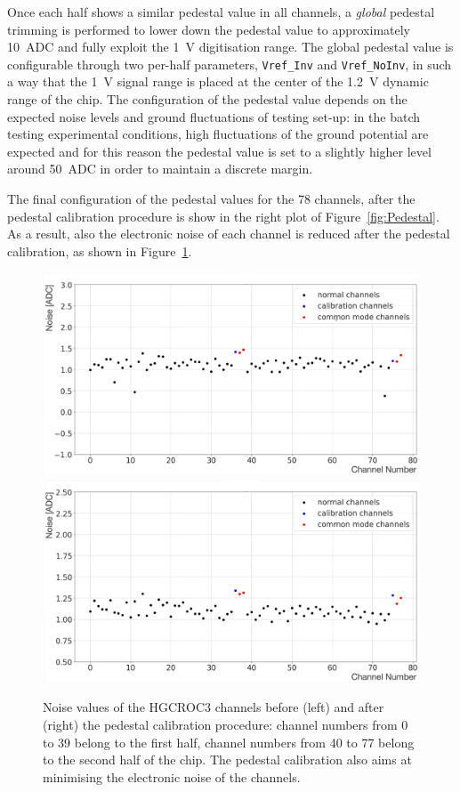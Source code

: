 \bigbreak

Once each half shows a similar pedestal value in all channels, a \textit{global} pedestal trimming is performed to lower down the pedestal value to approximately 10~ADC and fully exploit the 1~V digitisation range.
The global pedestal value is configurable through two per-half parameters, \texttt{Vref\_Inv} and \texttt{Vref\_NoInv}, in such a way that the 1~V signal range is placed at the center of the 1.2~V dynamic range of the chip.
The configuration of the pedestal value depends on the expected noise levels and ground fluctuations of testing set-up: in the batch testing experimental conditions, high fluctuations of the ground potential are expected and for this reason the pedestal value is set to a slightly higher level around 50~ADC in order to maintain a discrete margin.

The final configuration of the pedestal values for the 78 channels, after the pedestal calibration procedure is show in the right plot of Figure~\ref{fig:Pedestal}. As a result, also the electronic noise of each channel is reduced after the pedestal calibration, as shown in Figure~\ref{fig:Noise}.

\begin{figure}
    \centering
    \includegraphics[width=0.49\linewidth]{Figures/HGCAL/Noise_0.pdf}
    \includegraphics[width=0.49\linewidth]{Figures/HGCAL/Noise_1.pdf}
    \caption{Noise values of the HGCROC3 channels before (left) and after (right) the pedestal calibration procedure: channel numbers from 0 to 39 belong to the first half, channel numbers from 40 to 77 belong to the second half of the chip. The pedestal calibration also aims at minimising the electronic noise of the channels.}
    \label{fig:Noise}
\end{figure}

